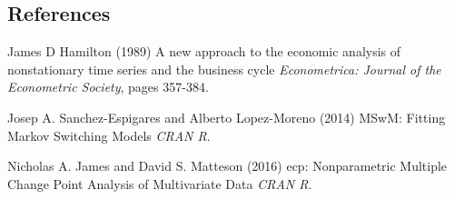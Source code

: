 \documentclass{beamer}
\begin{document}
\subsection{References}
\begin{frame}
\footnotesize{
\begin{thebibliography}{99} %
 James D Hamilton (1989)
\newblock A new approach to the economic analysis of nonstationary time series and the business cycle
\newblock \emph{Econometrica: Journal of the Econometric Society}, pages 357-384.
\end{thebibliography}

\begin{thebibliography}{99} %
 Josep A. Sanchez-Espigares and Alberto Lopez-Moreno (2014)
\newblock MSwM: Fitting Markov Switching Models
\newblock \emph{CRAN R}.
\end{thebibliography}

\begin{thebibliography}{99} %
 Nicholas A. James and David S. Matteson (2016)
\newblock ecp: Nonparametric Multiple Change Point Analysis of Multivariate Data
\newblock \emph{CRAN R}.
\end{thebibliography}
}
\end{frame}
\end{document}
